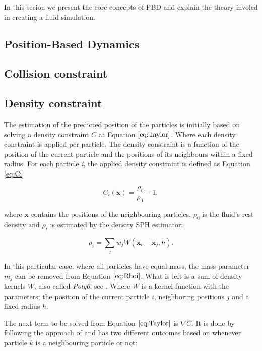 In this secion we present the core concepts of PBD and
explain the theory involed in creating a fluid simulation.

\subsection{Position-Based Dynamics}



\subsection{Collision constraint}


\subsection{Density constraint}

The estimation of the predicted position of the particles is initially based on
solving a density constraint $C$ at Equation $\ref{eq:Taylor}$. Where each
density constraint is applied per particle. The density constraint is a
function of the position of the current particle and the positions of its
neighbours within a fixed radius. For each particle \textit{i}, the applied
density constraint is defined as Equation \ref{eq:Ci}

\begin{equation}
\label{eq:Ci}
C_i(\mathbf{x}) = \frac{\rho_i}{\rho_0} - 1,
\end{equation}

where $\mathbf{x}$ contains the positions of the neighbouring particles,
$\rho_0$ is the fluid's rest density and $\rho_i$ is estimated by the density
SPH estimator:

\begin{equation}
\label{eq:Rhoi}
\rho_i = \sum\limits_{j} w_j W(\mathbf{x}_i - \mathbf{x}_j, h).
\end{equation}

In this particular case, where all particles have equal mass, the mass
parameter $m_j$ can be removed from Equation $\ref{eq:Rhoi}$. What is left is a
sum of density kernels $W$, also called \textit{Poly6}, see
\cite{muller2003particle}. Where $W$ is a kernel function with the parameters;
the position of the current particle  $i$, neighboring positions $j$ and a
fixed radius $h$.

The next term to be solved from Equation $\ref{eq:Taylor}$ is $\nabla C$. It is
done by following the approach of \cite{macklin2013position} and has two different outcomes based on whenever particle $k$ is a neighbouring particle or not:

